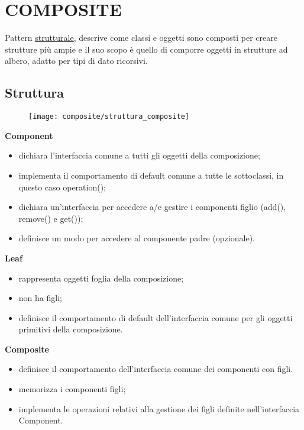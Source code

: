 \chapter{COMPOSITE}

Pattern \underline{strutturale}, descrive come classi e oggetti sono composti per creare strutture più ampie e il suo scopo è quello di comporre oggetti in strutture 
ad albero, adatto per tipi di dato ricorsivi.

\section{Struttura}

\begin{figure}[H]
    \centering
    \texttt{[image: composite/struttura\_composite]}
\end{figure}

\textbf{Component}
\begin{itemize}
    \item dichiara l’interfaccia comune a tutti gli oggetti della composizione;
    \item implementa il comportamento di default comune a tutte le sottoclassi, in questo caso operation();
    \item dichiara un’interfaccia per accedere a/e gestire i componenti figlio (add(), remove() e get());
    \item definisce un modo per accedere al componente padre (opzionale).
\end{itemize}

\textbf{Leaf}
\begin{itemize}
    \item rappresenta oggetti foglia della composizione;
    \item non ha figli;
    \item definisce il comportamento di default dell’interfaccia comune per gli oggetti primitivi della composizione.
\end{itemize} 

\textbf{Composite}
\begin{itemize}
    \item definisce il comportamento dell’interfaccia comune dei componenti con figli.
    \item memorizza i componenti figli;
    \item implementa le operazioni relativi alla gestione dei figli definite nell’interfaccia Component.
\end{itemize}

